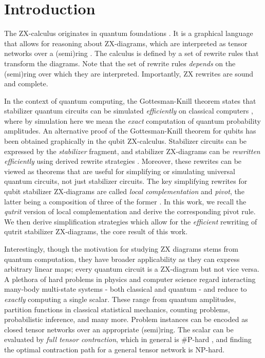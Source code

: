\section{Introduction}



The ZX-calculus originates in
quantum foundations \cite{Coecke2011,vandewetering2020zxcalculus}.
It is a graphical language that allows for reasoning about ZX-diagrams,
which are interpreted as tensor networks over
a (semi)ring \cite{wang2020completeness}.
The calculus
is defined by a set of rewrite rules
that transform the diagrams.
Note that the set of rewrite rules \emph{depends} on
the (semi)ring over which they are interpreted.
Importantly, ZX rewrites are sound and complete.


In the context of quantum computing,
the Gottesman-Knill theorem states that stabilizer quantum
circuits can be
simulated \emph{efficiently} on classical computers \cite{Aaronson2004},
where by simulation here we mean the \emph{exact} computation of quantum probability amplitudes.
An alternative
proof of the Gottesman-Knill theorem for qubits has been obtained graphically in the qubit ZX-calculus.
Stabilizer circuits can be expressed by the \emph{stabilizer}
fragment,
and stabilizer ZX-diagrams can be \emph{rewritten efficiently}
using derived rewrite strategies \cite{graph_theoretic_simplification}.
Moreover, these rewrites can be viewed as theorems
that are useful for simplifying or simulating universal quantum circuits, not just stabilizer circuits.
The key simplifying rewrites
for qubit stabilizer ZX-diagrams
are called \emph{local complementation} and \emph{pivot},
the latter being a composition of three of the former \cite{graph_theoretic_simplification}.
In this work, we recall the \emph{qutrit} version of local complementation \cite{harny_completeness} and derive the corresponding pivot rule.
We then derive simplification strategies
which allow for the \emph{efficient} rewriting of qutrit stabilizer ZX-diagrams,
the core result of this work.

Interestingly, though the motivation for studying ZX diagrams stems from quantum computation, they have broader applicability as they
can express arbitrary linear maps;
every quantum circuit is a ZX-diagram but not vice versa.
A plethora of hard problems in physics and computer science
regard interacting many-body multi-state systems - both classical and quantum -
and reduce to \emph{exactly} computing a single scalar.
These range from quantum amplitudes,
partition functions in classical statistical mechanics,
counting problems, probabilistic inference, and many more.
Problem instances can be encoded as closed
tensor networks over an appropriate (semi)ring.
The scalar can be evaluated by \emph{full tensor contraction},
which in general is \#P-hard \cite{Damm2002},
and finding the optimal contraction path for a general tensor network is NP-hard.


